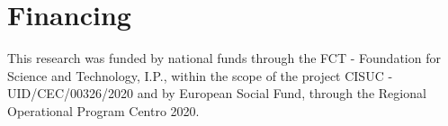 
\chapter*{Financing}

\begin{center}
This research was funded by national funds through the FCT - Foundation for Science and Technology, I.P., within the scope of the project CISUC - UID/CEC/00326/2020 and by European Social Fund, through the Regional Operational Program Centro 2020.
%
\end{center}